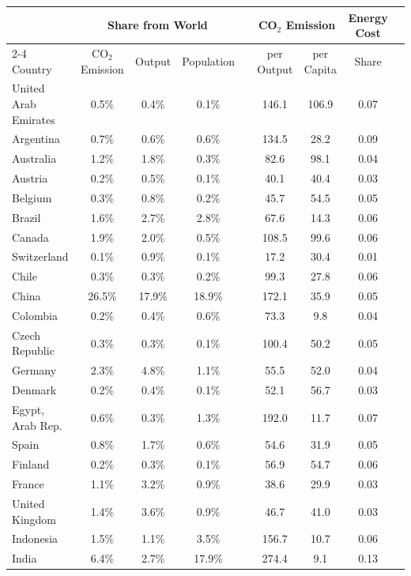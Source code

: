 \begin{center}
\footnotesize
\setlength{\tabcolsep}{4 pt} %
\renewcommand{\arraystretch}{0.8} %
\begin{tabular}{l ccc c cc c c}
\toprule
 & \multicolumn{3}{c}{Share from World} & & \multicolumn{2}{c}{CO$_2$ Emission} & Energy Cost \\
\cline{2-4}
\cline{6-7}
\addlinespace[3pt]
Country & CO$_2$ Emission & Output & Population & & per Output & per Capita & Share \\
\midrule
United Arab Emirates & 0.5\% & 0.4\% & 0.1\% && 146.1 & 106.9 & 0.07 \\
Argentina & 0.7\% & 0.6\% & 0.6\% && 134.5 & 28.2 & 0.09 \\
Australia & 1.2\% & 1.8\% & 0.3\% && 82.6 & 98.1 & 0.04 \\
Austria & 0.2\% & 0.5\% & 0.1\% && 40.1 & 40.4 & 0.03 \\
Belgium & 0.3\% & 0.8\% & 0.2\% && 45.7 & 54.5 & 0.05 \\
Brazil & 1.6\% & 2.7\% & 2.8\% && 67.6 & 14.3 & 0.06 \\
Canada & 1.9\% & 2.0\% & 0.5\% && 108.5 & 99.6 & 0.06 \\
Switzerland & 0.1\% & 0.9\% & 0.1\% && 17.2 & 30.4 & 0.01 \\
Chile & 0.3\% & 0.3\% & 0.2\% && 99.3 & 27.8 & 0.06 \\
China & 26.5\% & 17.9\% & 18.9\% && 172.1 & 35.9 & 0.05 \\
Colombia & 0.2\% & 0.4\% & 0.6\% && 73.3 & 9.8 & 0.04 \\
Czech Republic & 0.3\% & 0.3\% & 0.1\% && 100.4 & 50.2 & 0.05 \\
Germany & 2.3\% & 4.8\% & 1.1\% && 55.5 & 52.0 & 0.04 \\
Denmark & 0.2\% & 0.4\% & 0.1\% && 52.1 & 56.7 & 0.03 \\
Egypt, Arab Rep. & 0.6\% & 0.3\% & 1.3\% && 192.0 & 11.7 & 0.07 \\
Spain & 0.8\% & 1.7\% & 0.6\% && 54.6 & 31.9 & 0.05 \\
Finland & 0.2\% & 0.3\% & 0.1\% && 56.9 & 54.7 & 0.06 \\
France & 1.1\% & 3.2\% & 0.9\% && 38.6 & 29.9 & 0.03 \\
United Kingdom & 1.4\% & 3.6\% & 0.9\% && 46.7 & 41.0 & 0.03 \\
Indonesia & 1.5\% & 1.1\% & 3.5\% && 156.7 & 10.7 & 0.06 \\
India & 6.4\% & 2.7\% & 17.9\% && 274.4 & 9.1 & 0.13 \\

\end{tabular}
\end{center}
